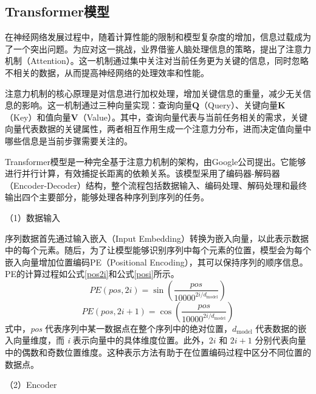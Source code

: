 \subsection{Transformer模型}
在神经网络发展过程中，随着计算性能的限制和模型复杂度的增加，信息过载成为了一个突出问题。为应对这一挑战，业界借鉴人脑处理信息的策略，提出了注意力机制（Attention）。这一机制通过集中关注对当前任务更为关键的信息，同时忽略不相关的数据，从而提高神经网络的处理效率和性能。

注意力机制的核心原理是对信息进行加权处理，增加关键信息的重量，减少无关信息的影响。这一机制通过三种向量实现：查询向量$\mathbf{Q}$（Query）、关键向量$\mathbf{K}$（Key）和值向量$\mathbf{V}$（Value）。其中，查询向量代表与当前任务相关的需求，关键向量代表数据的关键属性，两者相互作用生成一个注意力分布，进而决定值向量中哪些信息是当前步骤需要关注的。

Transformer模型是一种完全基于注意力机制的架构，由Google公司提出\cite{vaswani2023attention}。它能够进行并行计算，有效捕捉长距离的依赖关系。该模型采用了编码器-解码器（Encoder-Decoder）结构，整个流程包括数据输入、编码处理、解码处理和最终输出四个主要部分，能够处理各种序列到序列的任务。

（1）数据输入

序列数据首先通过输入嵌入（Input Embedding）转换为嵌入向量，以此表示数据中的每个元素。随后，为了让模型能够识别序列中每个元素的位置，模型会为每个嵌入向量增加位置编码PE（Positional Encoding），其可以保持序列的顺序信息。
PE的计算过程如公式\eqref{pos2i}和公式\eqref{posi}所示。
\begin{equation}
    PE(pos, 2i) = \sin\left(\frac{pos}{10000^{2i/d_{\text{model}}}}\right)
    \label{pos2i}
\end{equation}
\begin{equation}
    PE(pos, 2i+1) = \cos\left(\frac{pos}{10000^{2i/d_{\text{model}}}}\right)
    \label{posi}
\end{equation}
式中，\textit{pos} 代表序列中某一数据点在整个序列中的绝对位置，\(d_{\text{model}}\) 代表数据的嵌入向量维度，而 \textit{i} 表示向量中的具体维度位置。此外，\(2i\) 和 \(2i + 1\) 分别代表向量中的偶数和奇数位置维度。这种表示方法有助于在位置编码过程中区分不同位置的数据点。

（2）Encoder

